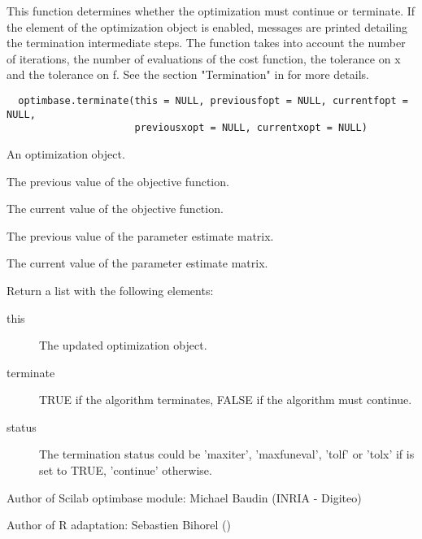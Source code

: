 %
\begin{Description}\relax
This function determines whether the optimization must continue or terminate.
If the  element of the optimization object is
enabled, messages are printed detailing the termination intermediate steps.
The  function takes into account the number of
iterations, the number of evaluations of the cost function, the tolerance on x
and the tolerance on f. See the section "Termination" in
 for more details.
\end{Description}
%
\begin{Usage}
\begin{verbatim}
  optimbase.terminate(this = NULL, previousfopt = NULL, currentfopt = NULL,
                      previousxopt = NULL, currentxopt = NULL)
\end{verbatim}
\end{Usage}
%
\begin{Arguments}
\begin{ldescription}
\item[\code{this}] An optimization object.
\item[\code{previousfopt}] The previous value of the objective function.
\item[\code{currentfopt}] The current value of the objective function.
\item[\code{previousxopt}] The previous value of the parameter estimate matrix.
\item[\code{currentxopt}] The current value of the parameter estimate matrix.
\end{ldescription}
\end{Arguments}
%
\begin{Value}
Return a list with the following elements: \begin{description}

\item[this] The updated optimization object.
\item[terminate] TRUE if the algorithm terminates, FALSE if the algorithm
must continue.
\item[status] The termination status could be 'maxiter', 'maxfuneval',
'tolf' or 'tolx' if  is set to TRUE, 'continue'
otherwise.

\end{description}

\end{Value}
%
\begin{Author}\relax
Author of Scilab optimbase module: Michael Baudin (INRIA - Digiteo)

Author of R adaptation: Sebastien Bihorel ()
\end{Author}
